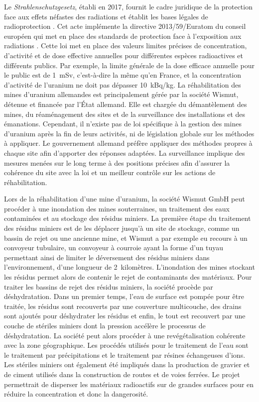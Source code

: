 \documentclass{article}
\begin{document}
Le \emph{Strahlenschutzgesetz}, établi en 2017, fournit le cadre juridique de la protection face aux effets néfastes des radiations et établit les bases légales de radioprotection \cite{noauthor_nuclear_nodate}. Cet acte implémente la directive 2013/59/Euratom du conseil européen qui met en place des standards de protection face à l’exposition aux radiations \cite{noauthor_directive_nodate}.
Cette loi met en place des valeurs limites précises de concentration, d’activité et de dose effective annuelles pour différentes espèces radioactives et différents publics. Par exemple, la limite générale de la dose efficace annuelle pour le public est de 1~mSv, c'est-à-dire la même qu'en France, et la concentration d’activité de l’uranium ne doit pas dépasser 10~kBq/kg.
La réhabilitation des mines d’uranium allemandes est principalement gérée par la société Wismut, détenue et financée par l'État allemand. Elle est chargée du démantèlement des mines, du réaménagement des sites et de la surveillance des installations et des émanations.
Cependant, il n’existe pas de loi spécifique à la gestion des mines d’uranium après la fin de leurs activités, ni de législation globale sur les méthodes à appliquer. Le gouvernement allemand préfère appliquer des méthodes propres à chaque site afin d’apporter des réponses adaptées. La surveillance implique des mesures menées sur le long terme à des positions précises afin d’assurer la cohérence du site avec la loi et un meilleur contrôle sur les actions de réhabilitation.

Lors de la réhabilitation d’une mine d’uranium, la société Wismut GmbH peut procéder à une inondation des mines souterraines, un traitement des eaux contaminées et au stockage des résidus miniers.
La première étape du traitement des résidus miniers est de les déplacer jusqu’à un site de stockage, comme un bassin de rejet ou une ancienne mine, et Wismut a par exemple eu recours à un convoyeur tubulaire, un convoyeur à courroie ayant la forme d’un tuyau permettant ainsi de limiter le déversement des résidus miniers dans l’environnement, d’une longueur de 2~kilomètres. L’inondation des mines stockant les résidus permet alors de contenir le rejet de contaminants des matériaux. Pour traiter les bassins de rejet des résidus miniers, la société procède par déshydratation. Dans un premier temps, l’eau de surface est pompée pour être traitée, les résidus sont recouverts par une couverture multicouche, des drains sont ajoutés pour déshydrater les résidus et enfin, le tout est recouvert par une couche de stériles miniers dont la pression accélère le processus de déshydratation. La société peut alors procéder à une revégétalisation cohérente avec la zone géographique. Les procédés utilisés pour le traitement de l’eau sont le traitement par précipitations et le traitement par résines échangeuses d’ions.
Les stériles miniers ont également été impliqués dans la production de gravier et de ciment utilisés dans la construction de routes et de voies ferrées. Le projet permettrait de disperser les matériaux radioactifs sur de grandes surfaces pour en réduire la concentration et donc la dangerosité.
\end{document}
